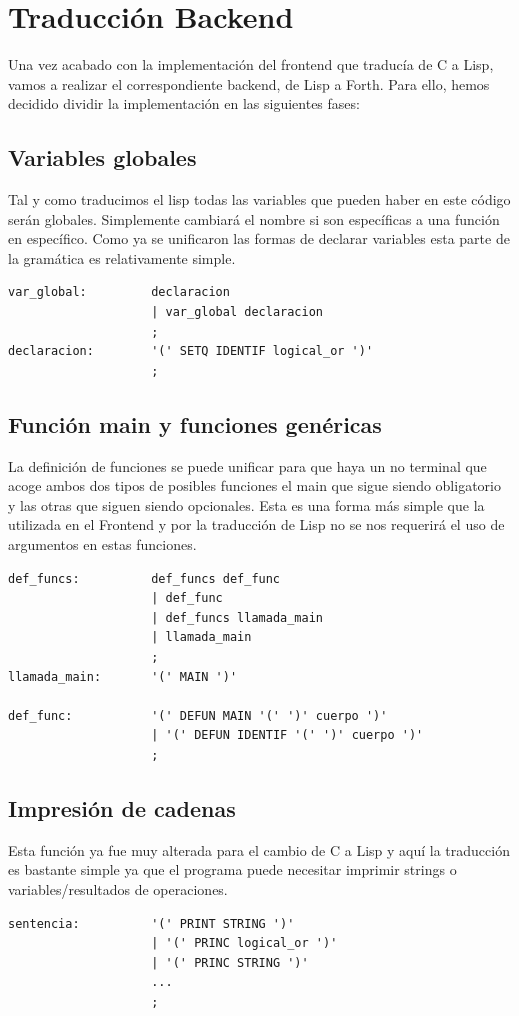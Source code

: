 \documentclass[12pt,a4paper]{article}
\begin{document}
\section{Traducción Backend}
\noindent Una vez acabado con la implementación del frontend que traducía de C a Lisp, vamos a 
realizar el correspondiente backend, de Lisp a Forth. Para ello, hemos decidido dividir la 
implementación en las siguientes fases:
\subsection{Variables globales}
\noindent Tal y como traducimos el lisp todas las variables que pueden haber en este código serán 
globales. Simplemente cambiará el nombre si son específicas a una función en específico. Como ya 
se unificaron las formas de declarar variables esta parte de la gramática es relativamente simple.
\begin{lstlisting}
var_global:         declaracion                                                        
                    | var_global declaracion
                    ;                               
declaracion:        '(' SETQ IDENTIF logical_or ')'
                    ; 
\end{lstlisting}
\subsection{Función main y funciones genéricas}
\noindent La definición de funciones se puede unificar para que haya un no terminal que acoge ambos 
dos tipos de posibles funciones el main que sigue siendo obligatorio y las otras que siguen siendo 
opcionales. Esta es una forma más simple que la utilizada en el Frontend y por la traducción de Lisp 
no se nos requerirá el uso de argumentos en estas funciones.
\begin{lstlisting}
def_funcs:          def_funcs def_func                
                    | def_func                                                         
                    | def_funcs llamada_main       
                    | llamada_main                                                      
                    ;
llamada_main:       '(' MAIN ')'

def_func:           '(' DEFUN MAIN '(' ')' cuerpo ')'
                    | '(' DEFUN IDENTIF '(' ')' cuerpo ')'
                    ;  
\end{lstlisting}
\subsection{Impresión de cadenas}
\noindent Esta función ya fue muy alterada para el cambio de C a Lisp y aquí la traducción es 
bastante simple ya que el programa puede necesitar imprimir strings o variables/resultados de 
operaciones. 
\begin{lstlisting}
sentencia:          '(' PRINT STRING ')'            
                    | '(' PRINC logical_or ')'          
                    | '(' PRINC STRING ')' 
                    ...
                    ;
\end{lstlisting}
\end{document}
